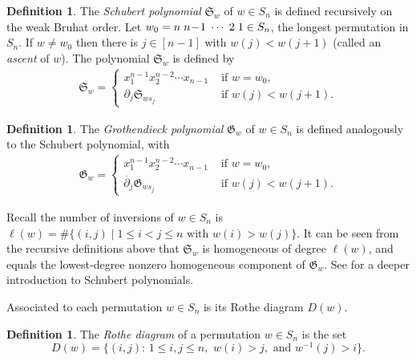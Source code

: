 \documentclass[11pt]{amsart}
\theoremstyle{definition}
\newtheorem{definition}[theorem]{Definition}
\theoremstyle{named}
\begin{document}
	\begin{definition}
		The \emph{Schubert polynomial} $\mathfrak{S}_w$ of $w\in S_n$ is defined recursively on the weak Bruhat order. Let $w_0=n \hspace{.1cm} n\!-\!1 \hspace{.1cm} \cdots \hspace{.1cm} 2 \hspace{.1cm} 1 \in S_n$, the longest permutation in $S_n$. If $w\neq w_0$ then there is $j\in [n-1]$ with $w(j)<w(j+1)$ (called an \emph{ascent} of $w$). The polynomial $\mathfrak{S}_w$ is defined by
		\begin{align*}
			\mathfrak{S}_w=\begin{cases}
				x_1^{n-1}x_2^{n-2}\cdots x_{n-1}&\mbox{ if } w=w_0,\\
				\partial_j \mathfrak{S}_{ws_j} &\mbox{ if } w(j)<w(j+1).
			\end{cases}
		\end{align*}
	\end{definition}
	
	\begin{definition}
		The \emph{Grothendieck polynomial} $\mathfrak{G}_w$ of $w\in S_n$ is defined analogously to the Schubert polynomial,
		with
		\begin{align*}
			\mathfrak{G}_w=\begin{cases}
				x_1^{n-1}x_2^{n-2}\cdots x_{n-1}&\mbox{ if } w=w_0,\\
				\overline{\partial}_j \mathfrak{G}_{ws_j} &\mbox{ if } w(j)<w(j+1).
			\end{cases}
		\end{align*}	
	\end{definition}
	
	Recall the number of inversions of $w\in S_n$ is $\ell(w)=\#\{(i,j)\mid 1\leq i<j\leq n \mbox{ with } w(i)>w(j) \}.$ It can be seen from the recursive definitions above that $\mathfrak{S}_w$ is homogeneous of degree $\ell(w)$, and equals the lowest-degree nonzero homogeneous component of $\mathfrak{G}_w$. See \cite{manivel} for a deeper introduction to Schubert polynomials. 
	
	Associated to each permutation $w\in S_n$ is its Rothe diagram $D(w)$.
	
	\begin{definition}
		The \emph{Rothe diagram} of a permutation $w\in S_n$ is the set
		\[D(w)=\{(i,j):\, 1\leq i,j\leq n,\,\, w(i)>j,\,\, \mbox{and } w^{-1}(j)>i \}.\]
	\end{definition}
	
\end{document}
